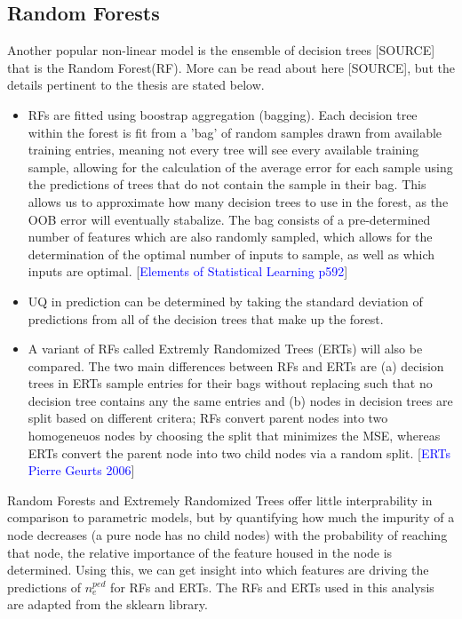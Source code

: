 \documentclass[a4paper, twoside, final, 12pt]{article}
\begin{document}
\subsection{Random Forests}
Another popular non-linear model is the ensemble of decision trees [SOURCE] that is the Random Forest(RF). More can be read about here [SOURCE], but the details pertinent to the thesis are stated below.
\begin{itemize}
	\item RFs are fitted using boostrap aggregation (bagging). Each decision tree within the forest is fit from a 'bag' of random samples drawn from available training entries, meaning not every tree will see every available training sample, allowing for the calculation of the average error for each sample using the predictions of trees that do not contain the sample in their bag. This allows us to approximate how many decision trees to use in the forest, as the OOB error will eventually stabalize. The bag consists of a pre-determined number of features which are also randomly sampled, which allows for the determination of the optimal number of inputs to sample, as well as which inputs are optimal.  [\textcolor{blue}{Elements of Statistical Learning p592}]
	\item UQ in prediction can be determined by taking the standard deviation of predictions from all of the decision trees that make up the forest. 
	\item A variant of RFs called Extremly Randomized Trees (ERTs) will also be compared. The two main differences between RFs and ERTs are (a) decision trees in ERTs sample entries for their bags without replacing such that no decision tree contains any the same entries and (b) nodes in decision trees are split based on different critera; RFs convert parent nodes into two homogeneuos nodes by choosing the split that minimizes the MSE, whereas ERTs convert the parent node into two child nodes via a random split. [\textcolor{blue}{ERTs Pierre Geurts 2006}]
\end{itemize}

Random Forests and Extremely Randomized Trees offer little interprability in comparison to parametric models, but by quantifying how much the impurity of a node decreases (a pure node has no child nodes) with the probability of reaching that node, the relative importance of the feature housed in the node is determined. Using this, we can get insight into which features are driving the predictions of $n_e^{ped}$ for RFs and ERTs. The RFs and ERTs used in this analysis are adapted from the sklearn library. 
\end{document}

